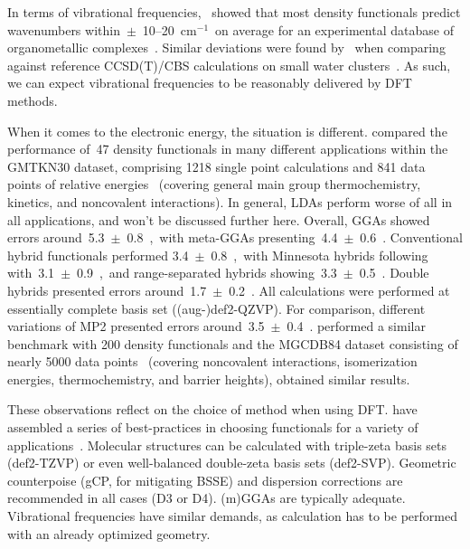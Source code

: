 
In terms of vibrational frequencies,~\citeauthor{Katari_2017} showed that most density functionals
predict wavenumbers within~$\pm$~10--20~cm$^{-1}$~on average for
an experimental database of organometallic complexes~\cite{Katari_2017}.
Similar deviations were found by~\citeauthor{Howard_2015}
when comparing against reference CCSD(T)/CBS calculations on
small water clusters~\cite{Howard_2015}.
As such,
we can expect vibrational frequencies to be reasonably delivered
by DFT methods.

When it comes to the electronic energy,
the situation is different.
\citeauthor{Goerigk_2011} compared the performance of~47 density functionals
in many different applications
within the GMTKN30 dataset,
comprising 1218 single point calculations
and 841 data points of relative energies~\cite{Goerigk_2011} (covering general main group thermochemistry,
kinetics,
and noncovalent interactions).
In general,
LDAs perform worse of all in all applications,
and won't be discussed further here.
Overall,
GGAs showed errors around~5.3~$\pm$~0.8~\kcalmol,~with meta-GGAs presenting~4.4~$\pm$~0.6~\kcalmol.
Conventional hybrid functionals performed 3.4~$\pm$~0.8~\kcalmol,~with Minnesota hybrids following with~3.1~$\pm$~0.9~\kcalmol,~and range-separated hybrids showing~3.3~$\pm$~0.5~\kcalmol.
Double hybrids presented errors
around~1.7~$\pm$~0.2~\kcalmol.
All calculations were performed at essentially complete basis set
((aug-)def2-QZVP).
For comparison,
different variations of MP2
presented errors around~3.5~$\pm$~0.4~\kcalmol.
\citeauthor{Mardirossian_2017} performed a similar
benchmark with 200 density functionals and the MGCDB84 dataset
consisting of nearly 5000 data points~\cite{Mardirossian_2017} (covering noncovalent interactions,
isomerization energies,
thermochemistry,
and barrier heights),
obtained similar results.

These observations reflect on the choice of method when using DFT.\@
\citeauthor{Bursch_2022} have assembled a series of best-practices in choosing functionals for a variety of applications~\cite{Bursch_2022}.
Molecular structures can be calculated with triple-zeta basis sets (def2-TZVP)
or even well-balanced double-zeta basis sets (def2-SVP).
Geometric counterpoise (gCP,
for mitigating BSSE) and dispersion corrections are recommended in all cases (D3 or D4).
(m)GGAs are typically adequate.
Vibrational frequencies have similar demands,
as calculation has to be performed with an already optimized geometry.

